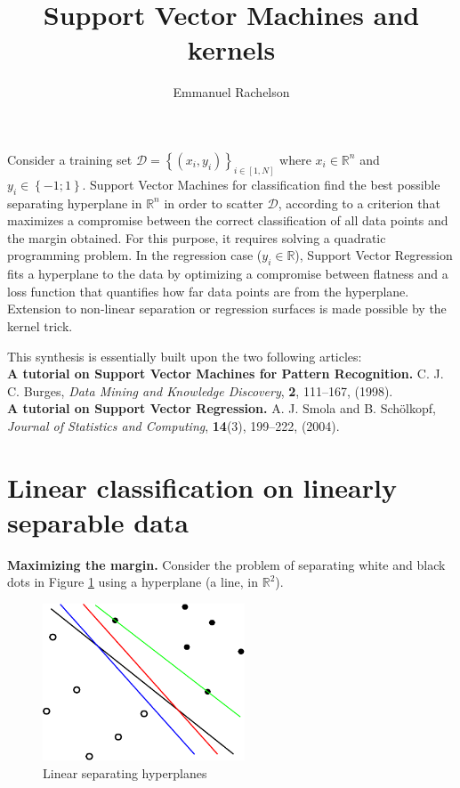 \documentclass{article}
\author{Emmanuel Rachelson}
\title{Support Vector Machines and kernels}
\date{}
\begin{document}
\maketitle



\noindent Consider a training set $\mathcal{D}= \left\{(x_i,y_i)\right\}_{i\in [1,N]}$ where $x_i\in\mathbb{R}^n$ and $y_i\in\left\{-1;1\right\}$. Support Vector Machines for classification find the best possible separating hyperplane in $\mathbb{R}^n$ in order to scatter $\mathcal{D}$, according to a criterion that maximizes a compromise between the correct classification of all data points and the margin obtained. For this purpose, it requires solving a quadratic programming problem. In the regression case ($y_i \in\mathbb{R}$), Support Vector Regression fits a hyperplane to the data by optimizing a compromise between flatness and a loss function that quantifies how far data points are from the hyperplane. Extension to non-linear separation or regression surfaces is made possible by the kernel trick.

This synthesis is essentially built upon the two following articles:\\
\textbf{A tutorial on Support Vector Machines for Pattern Recognition.} C. J. C. Burges, \textit{Data Mining and Knowledge Discovery}, \textbf{2}, 111--167, (1998).\\
\textbf{A tutorial on Support Vector Regression.} A. J. Smola and B. Sch\"olkopf, \textit{Journal of Statistics and Computing}, \textbf{14}(3), 199--222, (2004).

\section*{Linear classification on linearly separable data}

\textbf{Maximizing the margin.} 
Consider the problem of separating white and black dots in Figure \ref{fig:lin-lin} using a hyperplane (a line, in $\mathbb{R}^2$).
\begin{figure}
\begin{center}
\includegraphics[width=6cm]{../img/lin_sep2.pdf}
\end{center}
\caption{Linear separating hyperplanes}
\label{fig:lin-lin}
\end{figure}
\end{document}
